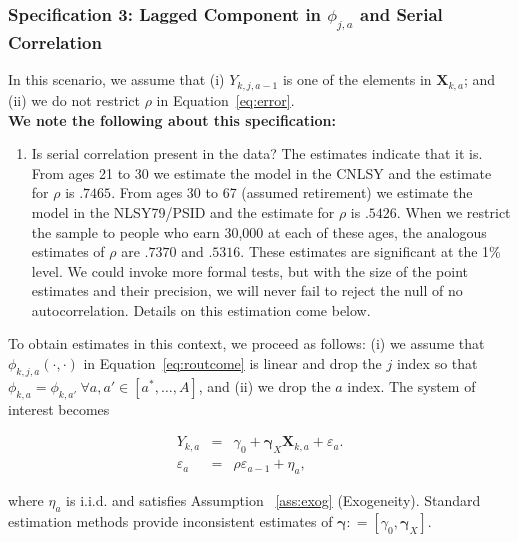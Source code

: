 \subsubsection{Specification 3: Lagged Component in $\phi_{j,a}$ and Serial Correlation} \label{section:laggedserial}

\noindent In this scenario, we assume that (i)  $Y_{k,j,a-1}$ is one of the elements in $\bm{X}_{k,a}$; and (ii) we do not restrict $\rho$ in Equation~\eqref{eq:error}.\\

\noindent \textbf{We note the following about this specification:}

\begin{enumerate}

\item Is serial correlation present in the data? The estimates indicate that it is. From ages 21 to 30 we estimate the model in the CNLSY and the estimate for $\rho$ is $.7465$. From ages 30 to 67 (assumed retirement) we estimate the model in the NLSY79/PSID and the estimate for $\rho$ is $.5426$. When we restrict the sample to people who earn 30,000 at each of these ages, the analogous estimates of $\rho$ are $.7370$ and $.5316$. These estimates are significant at the 1\% level. We could invoke more formal tests, but with the size of the point estimates and their precision, we will never fail to reject the null of no autocorrelation. Details on this estimation come below.\\

\end{enumerate}

\noindent To obtain estimates in this context, we proceed as follows: (i) we assume that $\phi_{k,j,a} \left( \cdot, \cdot \right)$ in Equation~\eqref{eq:routcome} is linear and drop the $j$ index so that $\phi_{k,a} = \phi_{k,a'} \ \forall a,a' \in [a^*, \ldots, A]$, and (ii) we drop the $a$ index. The system of interest becomes

\begin{eqnarray}
Y_{k,a} &=&\gamma_{0} + \bm{\gamma}_{X} \bm{X}_{k,a} + \varepsilon_{a}. \label{eq:linear1} \\
\varepsilon_{a} &=& \rho \varepsilon_{a-1} + \eta_{a}, \label{eq:linear2}
\end{eqnarray}

\noindent where $\eta_{a}$ is i.i.d. and satisfies Assumption ~\ref{ass:exog} (Exogeneity). Standard estimation methods provide inconsistent estimates of $\bm{\gamma} : = [\gamma_{0}, \bm{\gamma}_{X}]$.\\

